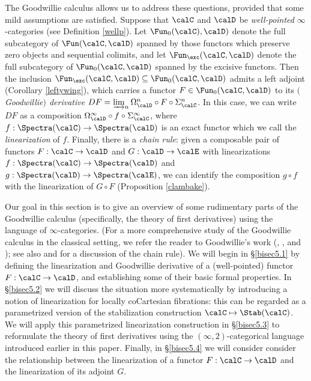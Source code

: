 The Goodwillie calculus allows us to address these questions, provided that some mild assumptions are satisfied. Suppose that $\calC$ and $\calD$ be {\it well-pointed} $\infty$-categories (see Definition \ref{wellp}). Let $\Fun_{0}(\calC), \calD)$ denote the full subcategory of
$\Fun(\calC, \calD)$ spanned by those functors which preserve zero objects and sequential colimits, and
let $\Fun_{\exc}(\calC, \calD)$ denote the full subcategory of $\Fun_0(\calC, \calD)$ spanned by
the excisive functors. Then the inclusion $\Fun_{\exc}(\calC, \calD) \subseteq \Fun_0(\calC, \calD)$
admits a left adjoint (Corollary \ref{leftywing}), which carries a functor $F \in \Fun_0(\calC, \calD)$
to its {\it $($Goodwillie$)$ derivative} $DF = \varinjlim_{n} \Omega^{n}_{\calD} \circ F \circ \Sigma^{n}_{\calC}$. In this case, we can write $DF$ as a composition $\Omega^{\infty}_{\calD} \circ f \circ \Sigma^{\infty}_{\calC}$, where $f: \Spectra(\calC) \rightarrow \Spectra(\calD)$ is an exact functor which we call
the {\it linearization} of $f$. Finally, there is a {\em chain rule}: given a composable pair of functors
$F: \calC \rightarrow \calD$ and $G: \calD \rightarrow \calE$ with linearizations
$f: \Spectra(\calC) \rightarrow \Spectra(\calD)$ and $g: \Spectra(\calD) \rightarrow \Spectra(\calE)$,
we can identify the composition $g \circ f$ with the linearization of $G \circ F$ (Proposition \ref{clambake}).

Our goal in this section is to give an overview of some rudimentary parts of the Goodwillie calculus (specifically, the theory of first derivatives) using the language of $\infty$-categories. (For
a more comprehensive study of the Goodwillie calculus in the classical setting,
we refer the reader to Goodwillie's work (\cite{goodwillieI}, \cite{goodwillieII}, and
\cite{goodwillie}); see also \cite{klein} and \cite{chingarone} for a discussion of the chain rule).
We will begin in \S \ref{bisec5.1} by defining the linearization and Goodwillie derivative of a (well-pointed) functor $F: \calC \rightarrow \calD$, and establishing some of their basic formal properties.
In \S \ref{bisec5.2} we will discuss the situation more systematically by introducing a notion of
linearization for locally coCartesian fibrations: this can be regarded as a parametrized version of the
stabilization construction $\calC \mapsto \Stab(\calC)$. We will apply this parametrized linearization
construction in \S \ref{bisec5.3} to reformulate the theory of first derivatives using the $(\infty,2)$-categorical language introduced earlier in this paper. Finally, in \S \ref{bisec5.4} we will consider
consider the relationship between the linearization of a functor $F: \calC \rightarrow \calD$ and the
linearization of its adjoint $G$.

